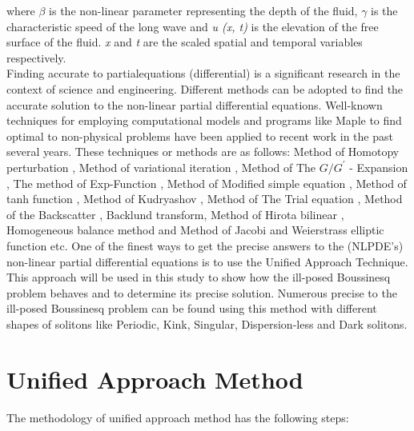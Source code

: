 \documentclass[10pt]{NSP1}
\numberwithin{equation}{section}
\begin{document}
where $\beta$ is the non-linear parameter representing the depth of the fluid, $\gamma$ is the characteristic speed of the long wave and \emph{u (x, t)} is the elevation of the free surface of the fluid. \emph{x} and \emph{t} are the scaled spatial and temporal variables respectively.\\
Finding accurate  to partialequations (differential) is a significant research in the context of science and engineering. Different methods can be adopted to find the accurate solution to the non-linear partial differential equations. Well-known techniques for employing computational models and programs like Maple to find optimal  to non-physical problems have been applied to recent work in the past several years. These techniques or methods are as follows: Method of Homotopy perturbation \cite{A1}, Method of variational iteration \cite{A2}, Method of The $G/G^{'}$ - Expansion \cite{A3,a4,a5}, The method of Exp-Function \cite{a6,a7,a8,a9}, Method of Modified simple equation \cite{a10,a11}, Method of tanh function \cite{a12,a13,a14}, Method of Kudryashov \cite{a15,a16}, Method of The Trial equation \cite{a17}, Method of the Backscatter \cite{a18}, Backlund transform\cite{a19}, Method of Hirota bilinear \cite{a20}, Homogeneous balance method\cite{a21} and Method of Jacobi and Weierstrass elliptic function \cite{a22} etc. One of the finest ways to get the precise answers to the (NLPDE's) non-linear partial differential equations is to use the Unified Approach Technique. This approach will be used in this study to show how the ill-posed Boussinesq problem behaves and to determine its precise solution. Numerous precise  to the ill-posed Boussinesq problem can be found using this method with different shapes of solitons like Periodic, Kink, Singular, Dispersion-less and Dark solitons.
\section{Unified Approach Method }
The methodology of unified approach method has the following steps:
\end{document}

